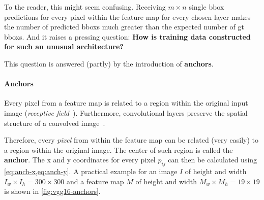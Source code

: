 To the reader, this might seem confusing. Receiving \(m\times n\)
single \gls{bbox} predictions for every pixel within the \gls{feature map} for
every chosen layer makes the number of predicted \glspl{bbox} much greater than the
expected number of \gls{gt} \glspl{bbox}. And it raises a pressing question:\linebreak
\textbf{How is training data constructed for such an unusual architecture?}

This question is answered (partly) by the introduction of \textbf{anchors}.

\paragraph{Anchors}\label{par:anchors}
Every pixel from a \gls{feature map} is related to a region within the original
input image (\emph{receptive field}~\cite[cf.][331\psq]{Goodfellow.2016}).
Furthermore, \glspl{convolutional layer} preserve the spatial structure of a
convolved image~\cite[cf.][335\psqq]{Goodfellow.2016}.

Therefore, every \emph{pixel} from within the feature map can be related
(very easily) to a region within the original image. The center of such region
is called the \textbf{anchor}. The x and y coordinates for every pixel \(p_{ij}\)
can then be calculated using \cref{eq:anch-x,eq:anch-y}. A practical example for an
image \(I\) of height and width \(I_w\times I_h=300\times 300\) and a
\gls{feature map} \(M\) of height and width \(M_w\times M_h=19\times 19\)
is shown in \cref{fig:vgg16-anchors}.


